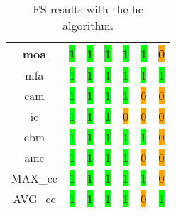 \begin{table}[H]
\begin{tabular}{|c|c|c|c|c|c|c|}
        \acrshort{moa} & \colorbox{lime}{1} & \colorbox{lime}{1} & \colorbox{lime}{1} & \colorbox{lime}{1} & \colorbox{lime}{1} & \colorbox{orange}{0} \\ \hline
        \acrshort{mfa} & \colorbox{lime}{1} & \colorbox{lime}{1} & \colorbox{lime}{1} & \colorbox{lime}{1} & \colorbox{lime}{1} & \colorbox{lime}{1} \\ \hline
        \acrshort{cam} & \colorbox{lime}{1} & \colorbox{lime}{1} & \colorbox{lime}{1} & \colorbox{lime}{1} & \colorbox{orange}{0} & \colorbox{orange}{0} \\ \hline
        \acrshort{ic} & \colorbox{lime}{1} & \colorbox{lime}{1} & \colorbox{lime}{1} & \colorbox{orange}{0} & \colorbox{orange}{0} & \colorbox{orange}{0} \\ \hline
        \acrshort{cbm} & \colorbox{lime}{1} & \colorbox{lime}{1} & \colorbox{lime}{1} & \colorbox{lime}{1} & \colorbox{lime}{1} & \colorbox{orange}{0} \\ \hline
        \acrshort{amc} & \colorbox{lime}{1} & \colorbox{lime}{1} & \colorbox{lime}{1} & \colorbox{lime}{1} & \colorbox{orange}{0} & \colorbox{orange}{0} \\ \hline
        MAX\_\acrshort{cc} & \colorbox{lime}{1} & \colorbox{lime}{1} & \colorbox{lime}{1} & \colorbox{lime}{1} & \colorbox{lime}{1} & \colorbox{orange}{0} \\ \hline
        AVG\_\acrshort{cc} & \colorbox{lime}{1} & \colorbox{lime}{1} & \colorbox{lime}{1} & \colorbox{lime}{1} & \colorbox{orange}{0} & \colorbox{lime}{1} \\ \hline
    \end{tabular}
\caption{FS results with the \acrlong{hc} algorithm.}
\label{tab:hc-output}
\end{table}

